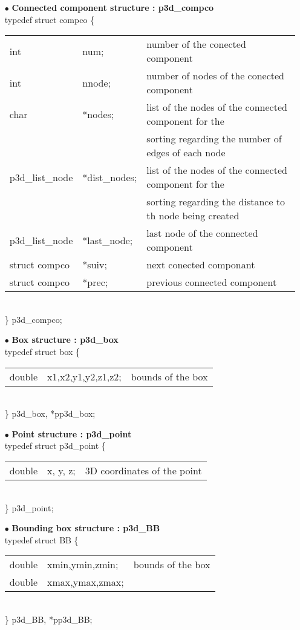 \begin{itemize}
\item[$\bullet$]{\bf Connected component structure : p3d\_compco}
\\

typedef struct compco \{\\
\begin{tabular}{l l l}
  int & num; & number of the conected component\\
  int & nnode; & number of nodes of the conected component\\
  char & *nodes; & list of the nodes of the connected component for the \\
       &         & sorting regarding the number of edges of
each node\\
  p3d\_list\_node & *dist\_nodes; &list of the nodes of the connected
component for the\\
       &         & sorting regarding the distance to th node
being created\\
  p3d\_list\_node & *last\_node; & last node of the connected component\\
  struct compco & *suiv; & next conected componant\\
  struct compco & *prec; & previous connected component\\
\end{tabular}\\
\} p3d\_compco;\\


\item[$\bullet$]{\bf Box structure : p3d\_box} \\

typedef struct box \{\\
\begin{tabular}{l l l}
  double & x1,x2,y1,y2,z1,z2; & bounds of the box \\
\end{tabular}\\
\} p3d\_box, *pp3d\_box;\\

\item[$\bullet$]{\bf Point structure : p3d\_point} \\

typedef struct p3d\_point \{\\
\begin{tabular}{l l l}
  double & x, y, z; & 3D coordinates of the point\\
\end{tabular}\\
\} p3d\_point;\\

\item[$\bullet$]{\bf Bounding box structure : p3d\_BB} \\

typedef struct BB \{ \\ 
\begin{tabular}{l l l}
    double & xmin,ymin,zmin; & bounds of the box\\
    double & xmax,ymax,zmax; & \\
\end{tabular}\\
\} p3d\_BB, *pp3d\_BB;

\end{itemize}
